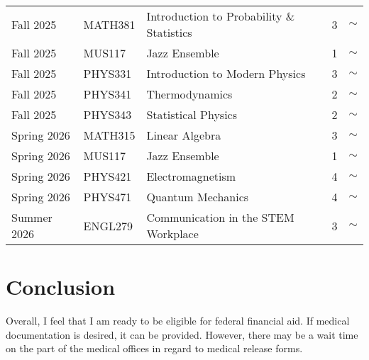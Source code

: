 \documentclass[12pt]{article}
\begin{document}
\begin{table}[]
\begin{tabular}{lllll}
Fall 2025         & MATH381         & Introduction to Probability \& Statistics & 3                & $\sim$         \\
Fall 2025         & MUS117          & Jazz Ensemble                             & 1                & $\sim$         \\
Fall 2025         & PHYS331         & Introduction to Modern Physics            & 3                & $\sim$         \\
Fall 2025         & PHYS341         & Thermodynamics                            & 2                & $\sim$         \\
Fall 2025         & PHYS343         & Statistical Physics                       & 2                & $\sim$         \\
Spring 2026       & MATH315         & Linear Algebra                            & 3                & $\sim$         \\
Spring 2026       & MUS117          & Jazz Ensemble                             & 1                & $\sim$         \\
Spring 2026       & PHYS421         & Electromagnetism                          & 4                & $\sim$         \\
Spring 2026       & PHYS471         & Quantum Mechanics                         & 4                & $\sim$         \\
Summer 2026       & ENGL279         & Communication in the STEM Workplace       & 3                & $\sim$        
\end{tabular}
\end{table}





\section*{Conclusion}
Overall, I feel that I am ready to be eligible for federal financial aid.
If medical documentation is desired, it can be provided.
However, there may be a wait time on the part of the medical offices
in regard to medical release forms.
\end{document}
